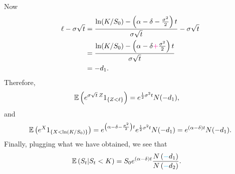 \begin{frame}[fragile,t]
\begin{myproof}[ (continued)]
Now
\begin{align*}
	\ell-\sigma \sqrt{t} & = \frac{\ln(K/S_0)-\left(\alpha-\delta-\frac{\sigma^2}{2}\right) t}{\sigma \sqrt{t}} - \sigma\sqrt{t}     \\
                       & = \frac{\ln(K/S_0)-\left(\alpha-\delta\textcolor{magenta}{+}\frac{\sigma^2}{2}\right) t}{\sigma \sqrt{t}} \\
                       & = -d_1.
\end{align*}
Therefore,
\begin{align*}
		\mathbb{E}\left(e^{\sigma \sqrt{t}\: Z}1_{\left\{Z<\ell\right\} }\right) & =e^{\frac{1}{2}\sigma^2 t} N(-d_1),
\end{align*}
and
\begin{align*}
	\mathbb{E}\left(e^X 1_{\left\{X< \ln\left(K/S_0\right) \right\} }\right)
	=e^{\left(\alpha-\delta-\frac{\sigma^2}{2}\right) t}e^{\frac{1}{2}\sigma^2 t} N(-d_1)
	=e^{\left(\alpha-\delta\right) t} N(-d_1).
\end{align*}
Finally, plugging what we have obtained, we see that
\begin{align*}
		\mathbb{E}\left(S_t|S_t<K\right) & = S_0 e^{(\alpha-\delta)t} \frac{N\left(\textcolor{cyan}{-}d_1\right)}{N\left(\textcolor{cyan}{-}d_2\right)}.
\end{align*}
\myEnd
\end{myproof}
\end{frame}
